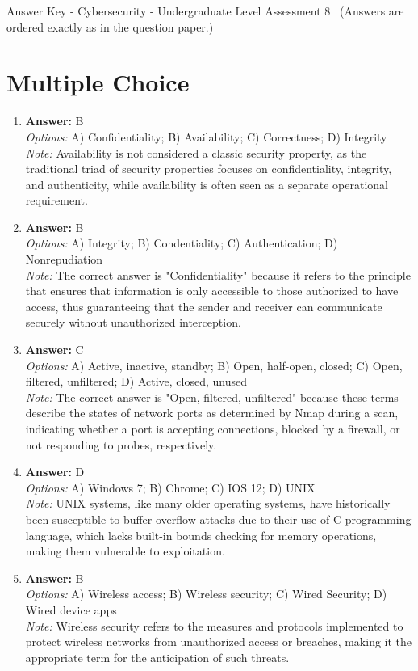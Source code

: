 \documentclass[12pt]{article}
\begin{document}
\begin{center}
Answer Key - Cybersecurity - Undergraduate Level Assessment 8 \
\small (Answers are ordered exactly as in the question paper.)
\end{center}

\section*{Multiple Choice}
\begin{enumerate}[label=\arabic*.]
\item \textbf{Answer:} B
\\ \textit{Options:} A) Confidentiality; B) Availability; C) Correctness; D) Integrity
\\ \textit{Note:} Availability is not considered a classic security property, as the traditional triad of security properties focuses on confidentiality, integrity, and authenticity, while availability is often seen as a separate operational requirement.
\item \textbf{Answer:} B
\\ \textit{Options:} A) Integrity; B) Condentiality; C) Authentication; D) Nonrepudiation
\\ \textit{Note:} The correct answer is "Confidentiality" because it refers to the principle that ensures that information is only accessible to those authorized to have access, thus guaranteeing that the sender and receiver can communicate securely without unauthorized interception.
\item \textbf{Answer:} C
\\ \textit{Options:} A) Active, inactive, standby; B) Open, half-open, closed; C) Open, filtered, unfiltered; D) Active, closed, unused
\\ \textit{Note:} The correct answer is "Open, filtered, unfiltered" because these terms describe the states of network ports as determined by Nmap during a scan, indicating whether a port is accepting connections, blocked by a firewall, or not responding to probes, respectively.
\item \textbf{Answer:} D
\\ \textit{Options:} A) Windows 7; B) Chrome; C) IOS 12; D) UNIX
\\ \textit{Note:} UNIX systems, like many older operating systems, have historically been susceptible to buffer-overflow attacks due to their use of C programming language, which lacks built-in bounds checking for memory operations, making them vulnerable to exploitation.
\item \textbf{Answer:} B
\\ \textit{Options:} A) Wireless access; B) Wireless security; C) Wired Security; D) Wired device apps
\\ \textit{Note:} Wireless security refers to the measures and protocols implemented to protect wireless networks from unauthorized access or breaches, making it the appropriate term for the anticipation of such threats.
\end{enumerate}
\end{document}
